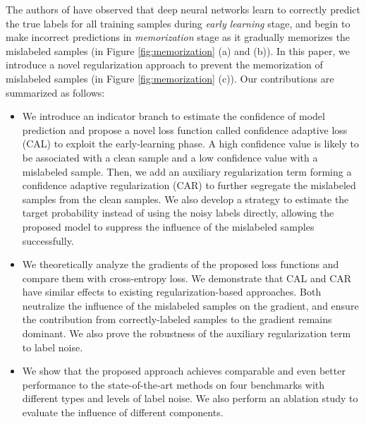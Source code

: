 \documentclass{article}
\begin{document}
The authors of \cite{arpit2017closer,zhang2018understanding,li2020gradient,liu2020early} have observed that deep neural networks learn to correctly predict the true labels for all training samples during \emph{early learning} stage, and begin to make incorrect predictions in \emph{memorization} stage as it gradually memorizes the mislabeled samples (in Figure \ref{fig:memorization} (a) and (b)). In this paper, we introduce a novel regularization approach to prevent the memorization of mislabeled samples (in Figure \ref{fig:memorization} (c)). Our contributions are summarized as follows:

\begin{itemize}[leftmargin=0.3cm]
	\item We introduce an indicator branch to estimate the confidence of model prediction and propose a novel loss function called confidence adaptive loss (CAL) to exploit the early-learning phase. A high confidence value is likely to be associated with a clean sample and a low confidence value with a mislabeled sample. Then, we add an auxiliary regularization term forming a confidence adaptive regularization (CAR) to further segregate the mislabeled samples from the clean samples. We also develop a strategy to estimate the target probability instead of using the noisy labels directly, allowing the proposed model to suppress the influence of the mislabeled samples successfully.
\item We theoretically analyze the gradients of the proposed loss functions and compare them with cross-entropy loss. We demonstrate that CAL and CAR have similar effects to existing regularization-based approaches. Both neutralize the influence of the mislabeled samples on the gradient, and ensure the contribution from correctly-labeled samples to the gradient remains dominant. We also prove the robustness of the auxiliary regularization term to label noise. 
 	\item We show that the proposed approach achieves comparable and even better performance to the state-of-the-art methods on four benchmarks with different types and levels of label noise. We also perform an ablation study to evaluate the influence of different components. \end{itemize}
\end{document}
